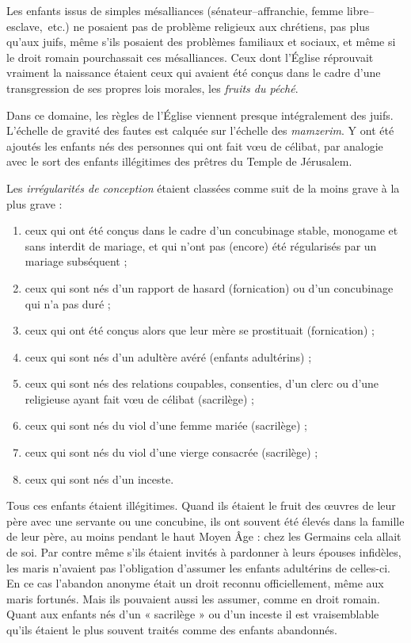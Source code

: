  Les enfants issus de simples mésalliances (sénateur--affranchie, femme libre--esclave,~etc.) ne posaient pas de problème religieux aux chrétiens, pas plus qu'aux juifs, même s'ils posaient des problèmes familiaux et sociaux, et même si le droit romain pourchassait ces mésalliances. Ceux dont l'Église réprouvait vraiment la naissance étaient ceux qui avaient été conçus dans le cadre d'une transgression de ses propres lois morales, les \emph{fruits du péché}. 

 Dans ce domaine, les règles de l'Église viennent presque intégralement des juifs. L'échelle de gravité des fautes est calquée sur l'échelle des \emph{mamzerim}. Y ont été ajoutés les enfants nés des personnes qui ont fait vœu de célibat, par analogie avec le sort des enfants illégitimes des prêtres du Temple de Jérusalem. 

 Les \emph{irrégularités de conception} étaient classées comme suit de la moins grave à la plus grave :
\begin{enumerate}
\item ceux qui ont été conçus dans le cadre d'un concubinage stable, monogame et sans interdit de mariage, et qui n'ont pas (encore) été régularisés par un mariage subséquent ;
\item ceux qui sont nés d'un rapport de hasard (fornication) ou d'un concubinage qui n'a pas duré ;
\item ceux qui ont été conçus alors que leur mère se prostituait (fornication) ;
\item ceux qui sont nés d'un adultère avéré (enfants adultérins) ;
\item ceux qui sont nés des relations coupables, consenties, d'un clerc ou d'une religieuse ayant fait vœu de célibat (sacrilège) ;
\item ceux qui sont nés du viol d'une femme mariée (sacrilège) ;
\item ceux qui sont nés du viol d'une vierge consacrée (sacrilège) ;
\item ceux qui sont nés d'un inceste. 
\end{enumerate}

 Tous ces enfants étaient illégitimes. Quand ils étaient le fruit des œuvres de leur père avec une servante ou une concubine, ils ont souvent été élevés dans la famille de leur père, au moins pendant le haut Moyen Âge : chez les Germains cela allait de soi. Par contre même s'ils étaient invités à pardonner à leurs épouses infidèles, les maris n'avaient pas l'obligation d'assumer les enfants adultérins de celles-ci. En ce cas l'abandon anonyme était un droit reconnu officiellement, même aux maris fortunés. Mais ils pouvaient aussi les assumer, comme en droit romain. Quant aux enfants nés d'un « sacrilège » ou d'un inceste il est vraisemblable qu'ils étaient le plus souvent traités comme des enfants abandonnés.


